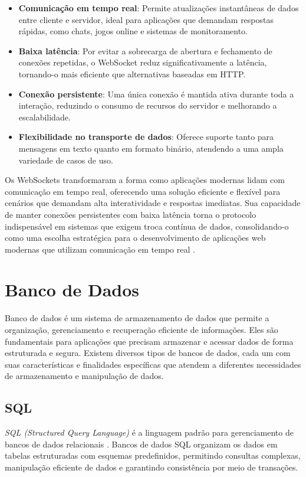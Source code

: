 \begin{itemize}
    \item \textbf{Comunicação em tempo real}: Permite atualizações instantâneas de dados entre cliente e servidor, ideal para aplicações que demandam respostas rápidas, como chats, jogos online e sistemas de monitoramento.
    \item \textbf{Baixa latência}: Por evitar a sobrecarga de abertura e fechamento de conexões repetidas, o WebSocket reduz significativamente a latência, tornando-o mais eficiente que alternativas baseadas em HTTP.
    \item \textbf{Conexão persistente}: Uma única conexão é mantida ativa durante toda a interação, reduzindo o consumo de recursos do servidor e melhorando a escalabilidade.
    \item \textbf{Flexibilidade no transporte de dados}: Oferece suporte tanto para mensagens em texto quanto em formato binário, atendendo a uma ampla variedade de casos de uso.
\end{itemize}

Os WebSockets transformaram a forma como aplicações modernas lidam com comunicação em tempo real, oferecendo uma solução eficiente e flexível para cenários que demandam alta interatividade e respostas imediatas. Sua capacidade de manter conexões persistentes com baixa latência torna o protocolo indispensável em sistemas que exigem troca contínua de dados, consolidando-o como uma escolha estratégica para o desenvolvimento de aplicações web modernas que utilizam comunicação em tempo real \cite{murley2021websocket}.


\section{Banco de Dados}

Banco de dados é um sistema de armazenamento de dados que permite a organização, gerenciamento e recuperação eficiente de informações. Eles são fundamentais para aplicações que precisam armazenar e acessar dados de forma estruturada e segura. Existem diversos tipos de bancos de dados, cada um com suas características e finalidades específicas que atendem a diferentes necessidades de armazenamento e manipulação de dados.


\subsection{SQL}

\emph{SQL (Structured Query Language)} é a linguagem padrão para gerenciamento de bancos de dados relacionais \cite{sql-wiki}. Bancos de dados SQL organizam os dados em tabelas estruturadas com esquemas predefinidos, permitindo consultas complexas, manipulação eficiente de dados e garantindo consistência por meio de transações.


